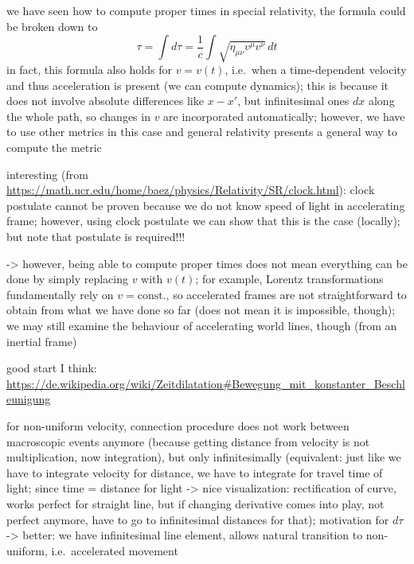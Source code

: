 we have seen how to compute proper times in special relativity, the formula could be broken down to 
\begin{equation*}
	\tau = \int d\tau = \frac{1}{c} \int \sqrt{\eta_{\mu \nu} v^\mu v^\nu} \, dt
\end{equation*}
in fact, this formula also holds for $v = v(t)$, i.e.~when a time-dependent velocity and thus acceleration is present (we can compute dynamics); this is because it does not involve absolute differences like $x - x'$, but infinitesimal ones $dx$ along the whole path, so changes in $v$ are incorporated automatically; however, we have to use other metrics in this case and general relativity presents a general way to compute the metric


interesting (from \url{https://math.ucr.edu/home/baez/physics/Relativity/SR/clock.html}): clock postulate cannot be proven because we do not know speed of light in accelerating frame; however, using clock postulate we can show that this is the case (locally); but note that postulate is required!!!


-> however, being able to compute proper times does not mean everything can be done by simply replacing $v$ with $v(t)$; for example, Lorentz transformations fundamentally rely on $v = \text{const.}$, so accelerated frames are not straightforward to obtain from what we have done so far (does not mean it is impossible, though); we may still examine the behaviour of accelerating world lines, though (from an inertial frame)



good start I think: \url{https://de.wikipedia.org/wiki/Zeitdilatation#Bewegung_mit_konstanter_Beschleunigung}




for non-uniform velocity, connection procedure does not work between macroscopic events anymore (because getting distance from velocity is not multiplication, now integration), but only infinitesimally (equivalent: just like we have to integrate velocity for distance, we have to integrate for travel time of light; since time = distance for light -> nice visualization: rectification of curve, works perfect for straight line, but if changing derivative comes into play, not perfect anymore, have to go to infinitesimal distances for that); motivation for $d\tau$ -> better: we have infinitesimal line element, allows natural transition to non-uniform, i.e.~accelerated movement







